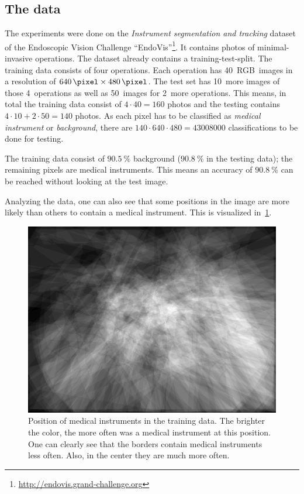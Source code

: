 
\subsection{The data}

The experiments were done on the \textit{Instrument segmentation and tracking}
dataset of the Endoscopic Vision Challenge
\enquote{EndoVis}\footnote{\href{http://endovis.grand-challenge.org/}{http://endovis.grand-challenge.org}}.
It contains photos of minimal-invasive operations. The dataset already contains
a training-test-split. The training data consists of four operations. Each
operation has 40~RGB~images in a resolution of $\SI{640}{\pixel} \times
\SI{480}{\pixel}$. The test set has 10~more images of those 4~operations as
well as 50~images for 2~more operations. This means, in total the training data
consist of $4 \cdot 40 = 160$ photos and the testing contains $4 \cdot 10 + 2
\cdot 50 = 140$ photos. As each pixel has to be classified as \textit{medical
instrument} or \textit{background}, there are
$140 \cdot 640 \cdot 480 = \num{43008000}$ classifications to be done for
testing.

The training data consist of $\SI{90.5}{\percent}$ background
($\SI{90.8}{\percent}$ in the testing data); the remaining pixels are medical
instruments. This means an accuracy of $\SI{90.8}{\percent}$ can be reached
without looking at the test image.

Analyzing the data, one can also see that some positions in the image are more
likely than others to contain a medical instrument. This is visualized
in~\cref{fig:medical-instrument-positions}.

\begin{figure}[ht]
    \centering
    \includegraphics[width=\linewidth]{images/instrument-positions.png}
    \caption{Position of medical instruments in the training data.
             The brighter the color, the more often was a medical instrument
             at this position. One can clearly see that the borders contain
             medical instruments less often. Also, in the center they are much
             more often.}
    \label{fig:medical-instrument-positions}
\end{figure}
